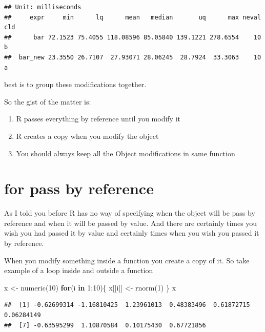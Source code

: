 \documentclass[
]{book}
\newenvironment{Shaded}{\begin{snugshade}}{\end{snugshade}}
\newcommand{\ControlFlowTok}[1]{\textcolor[rgb]{0.13,0.29,0.53}{\textbf{#1}}}
\newcommand{\DecValTok}[1]{\textcolor[rgb]{0.00,0.00,0.81}{#1}}
\newcommand{\FunctionTok}[1]{\textcolor[rgb]{0.00,0.00,0.00}{#1}}
\newcommand{\NormalTok}[1]{#1}
\newcommand{\OtherTok}[1]{\textcolor[rgb]{0.56,0.35,0.01}{#1}}
\newcommand{\SpecialCharTok}[1]{\textcolor[rgb]{0.00,0.00,0.00}{#1}}
\providecommand{\tightlist}{%
  \setlength{\itemsep}{0pt}\setlength{\parskip}{0pt}}
\begin{document}
\begin{verbatim}
## Unit: milliseconds
##     expr     min      lq      mean   median       uq      max neval cld
##      bar 72.1523 75.4055 118.08596 85.05840 139.1221 278.6554    10   b
##  bar_new 23.3550 26.7107  27.93071 28.06245  28.7924  33.3063    10  a
\end{verbatim}

best is to group these modifications together.

So the gist of the matter is:

\begin{enumerate}
\def\labelenumi{\arabic{enumi}.}
\tightlist
\item
  R passes everything by reference until you modify it
\item
  R creates a copy when you modify the object
\item
  You should always keep all the Object modifications in same function
\end{enumerate}

\hypertarget{for-pass-by-reference}{%
\section{for pass by reference}\label{for-pass-by-reference}}

As I told you before R has no way of specifying when the object will be pass by reference and when it will be passed by value. And there are certainly times you wish you had passed it by value and certainly times when you wish you passed it by reference.

When you modify something inside a function you create a copy of it. So take example of a loop inside and outside a function

\begin{Shaded}
\begin{Highlighting}[]
\NormalTok{x }\OtherTok{\textless{}{-}} \FunctionTok{numeric}\NormalTok{(}\DecValTok{10}\NormalTok{)}
\ControlFlowTok{for}\NormalTok{(i }\ControlFlowTok{in} \DecValTok{1}\SpecialCharTok{:}\DecValTok{10}\NormalTok{)\{}
\NormalTok{  x[[i]] }\OtherTok{\textless{}{-}} \FunctionTok{rnorm}\NormalTok{(}\DecValTok{1}\NormalTok{)}
\NormalTok{\}}
\NormalTok{x}
\end{Highlighting}
\end{Shaded}

\begin{verbatim}
##  [1] -0.62699314 -1.16810425  1.23961013  0.48383496  0.61872715  0.06284149
##  [7] -0.63595299  1.10870584  0.10175430  0.67721856
\end{verbatim}
\end{document}

